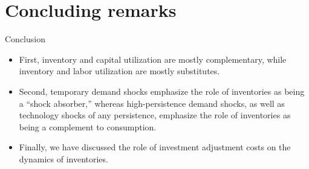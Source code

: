 \documentclass[fontset=windows,12pt,t,aspectratio=169]{beamer}
\begin{document}
\section{Concluding remarks}
\begin{frame}{Conclusion}
    \begin{center}
      \begin{itemize}
      \vspace{8pt} %
      \item First, inventory and capital utilization are mostly complementary, while inventory and labor utilization are mostly substitutes.
      \vspace{8pt}
      \item Second, temporary demand shocks emphasize the role of inventories as being a “shock absorber,” whereas high-persistence demand shocks, as well as technology shocks of any persistence, emphasize the role of inventories as being a complement to consumption.
      \vspace{8pt}
      \item Finally, we have discussed the role of investment adjustment costs on the dynamics of inventories.
    \end{itemize}
    \end{center}
\end{frame}
\end{document}
